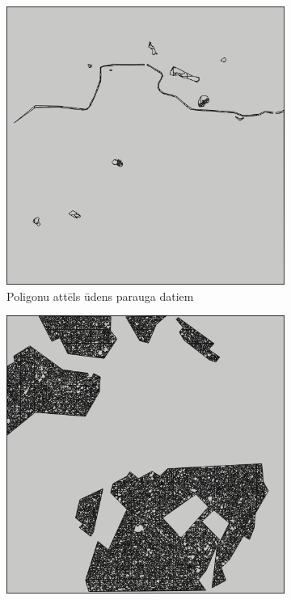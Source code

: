 \documentclass[12pt,paper=a4]{report}
\begin{document}
\begin{figure}[h!]
\centering
\begin{subfigure}[b]{.3\linewidth}
\includegraphics[width=\linewidth]{udensPolygons}
\caption{Poligonu attēls ūdens parauga datiem}\label{fig:udensPoly}
\end{subfigure}
\begin{subfigure}[b]{.3\linewidth}
\includegraphics[width=\linewidth]{kokiPolygons}

\end{subfigure}
\end{figure}
\end{document}
